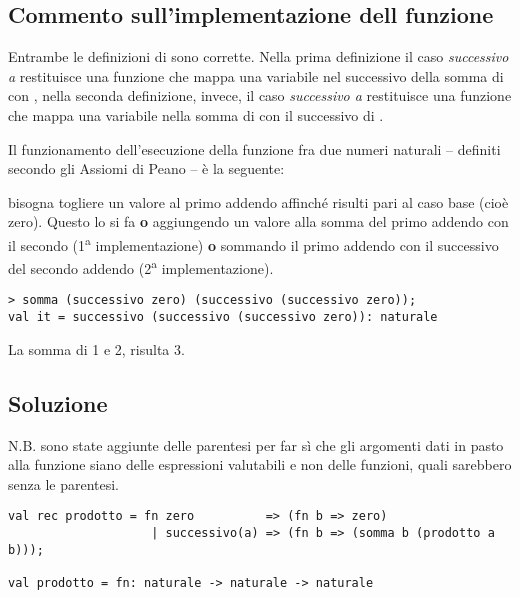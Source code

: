 \subsection{Commento sull'implementazione dell funzione }

Entrambe le definizioni di  sono corrette. Nella prima definizione il caso \emph{successivo a} restituisce una funzione che mappa una variabile  nel successivo della somma di  con , nella seconda definizione, invece, il caso \emph{successivo a} restituisce una funzione che mappa una variabile  nella somma di  con il successivo di .

\medskip
Il funzionamento dell'esecuzione della funzione  fra due numeri naturali -- definiti secondo gli Assiomi di Peano -- è la seguente:

\smallskip
bisogna togliere un valore  al primo addendo affinché risulti pari al caso base (cioè zero). Questo lo si fa \textbf{o} aggiungendo un valore  alla somma del primo addendo con il secondo (1\textsuperscript{a} implementazione) \textbf{o} sommando il primo addendo con il successivo del secondo addendo (2\textsuperscript{a} implementazione).

\begin{lstlisting}[style = SML, caption = {Esempio di esecuzione di \sml{somma}}]
> somma (successivo zero) (successivo (successivo zero));
val it = successivo (successivo (successivo zero)): naturale
\end{lstlisting}

La somma di 1 e 2, risulta 3.

\subsection{Soluzione}

N.B. sono state aggiunte delle parentesi per far sì che gli argomenti dati in pasto alla funzione  siano delle espressioni valutabili e non delle funzioni, quali sarebbero senza le parentesi.

\begin{lstlisting}[style = SML, caption={Definizione della funzione \sml{prodotto} tramite gli Assiomi di Peano}]
val rec prodotto = fn zero			=> (fn b => zero)
					| successivo(a) => (fn b => (somma b (prodotto a b)));

val prodotto = fn: naturale -> naturale -> naturale
\end{lstlisting}

